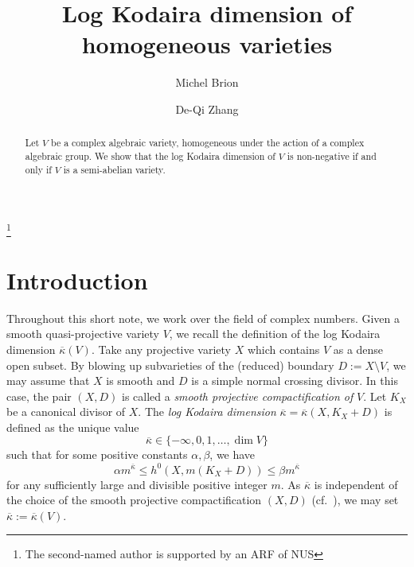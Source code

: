 \documentclass[12pt,a4paper]{amsart}
\theoremstyle{plain}
\theoremstyle{definition}
\theoremstyle{remark}
\begin{document}
\title[Log Kodaira dimension of homogeneous varieties]
{Log Kodaira dimension of homogeneous varieties}

\author{Michel Brion}
\address
{
\textsc{Institut Fourier, Universit\'e de Grenoble,}\endgraf
\textsc{
B.P. 74, 38402 Saint-Martin d'H\`eres, France
}}

\author{De-Qi Zhang}
\address
{
\textsc{Department of Mathematics, National University of Singapore,} \endgraf
\textsc{
10 Lower Kent Ridge Road,
Singapore 119076
}}

\begin{abstract}
Let $V$ be a complex algebraic variety, homogeneous under the action
of a complex algebraic group. We show that the log Kodaira dimension
of $V$ is non-negative if and only if $V$ is a semi-abelian variety.
\end{abstract}


\thanks{The second-named author is supported by an ARF of NUS}

\maketitle

\section{Introduction}\label{Intro}
Throughout this short note, we work over the field of complex numbers.
Given a smooth quasi-projective variety $V$,
we recall the definition of the log Kodaira dimension
$\overline{\kappa}(V)$. Take any projective variety $X$ which contains
$V$ as a dense open subset. By blowing up subvarieties of the (reduced) boundary
$D := X \setminus V$, we may assume that $X$ is smooth and $D$ is
a simple normal crossing divisor. In this case, the pair $(X, D)$
is called a {\it smooth projective compactification of} $V$.
Let $K_X$ be a canonical divisor of $X$. The {\it log Kodaira dimension}
$\overline{\kappa} = \overline{\kappa}(X, K_X + D)$ is defined
as the unique value
\[ \overline{\kappa}  \in \{ -\infty, 0, 1, \dots, \dim V \} \]
such that for some positive constants $\alpha, \beta$, we have
\[
\alpha m^{\overline{\kappa}} \le h^0(X, m(K_X + D)) \le \beta m^{\overline{\kappa}}
\]
for any sufficiently large and divisible positive integer $m$.
As $\overline{\kappa}$ is independent of the choice of the smooth
projective compactification $(X, D)$ (cf.~\cite[\S 11.1]{Ii81}), we may
set $\overline{\kappa} := \overline{\kappa}(V)$.
\end{document}
